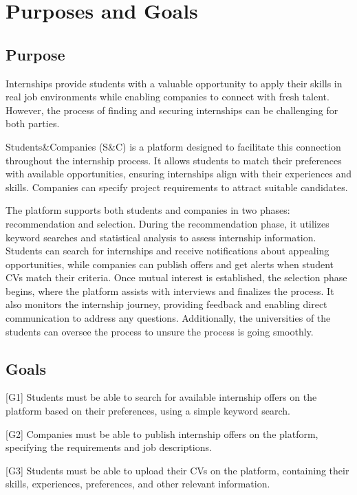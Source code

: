 
\renewcommand{\thesection}{\Alph{section}}
\section{Purposes and Goals}
\label{sec:purposeandgoals}
\subsection{Purpose}
\label{subsec:purpose}
Internships provide students with a valuable opportunity to apply their skills in real job environments while enabling companies to connect with 
fresh talent. However, the process of finding and securing internships can be challenging for both parties.

Students\&Companies (S\&C) is a platform designed to facilitate this connection throughout the internship process. It allows 
students to match their preferences with available opportunities, ensuring internships align with their experiences and skills. 
Companies can specify project requirements to attract suitable candidates.

The platform supports both students and companies in two phases: recommendation and selection. During the recommendation phase, 
it utilizes keyword searches and statistical analysis to assess internship information. Students can search for internships and receive 
notifications about appealing opportunities, while companies can publish offers and get alerts when student CVs match their criteria.
Once mutual interest is established, the selection phase begins, where the platform assists with interviews and finalizes the process. 
It also monitors the internship journey, providing feedback and enabling direct communication to address any questions. Additionally, 
the universities of the students can oversee the process to unsure the process is going smoothly.

\subsection{Goals}
\label{subsec:goals}
[G1] Students must be able to search for available internship offers on the platform based on their preferences, using a simple keyword search.

[G2] Companies must be able to publish internship offers on the platform, specifying the requirements and job descriptions.

[G3] Students must be able to upload their CVs on the platform, containing their skills, experiences, preferences, and other relevant information.

